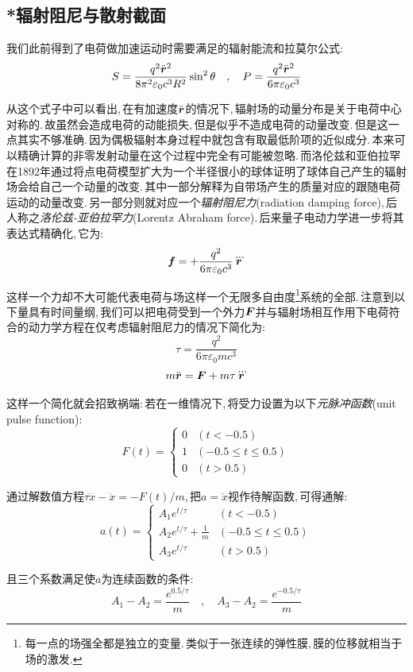 \subsection{*辐射阻尼与散射截面}

我们此前得到了电荷做加速运动时需要满足的辐射能流和拉莫尔公式:
\[S=\frac{q^2\ddot{\boldsymbol{r}}^2}{8\pi^2\varepsilon_0c^3 R^2}\sin^2\theta\quad ,\quad P=\frac{q^2\ddot{\boldsymbol{r}}^2}{6\pi\varepsilon_0c^3}\]

从这个式子中可以看出,\,在有加速度$\ddot{\boldsymbol{r}}$的情况下,\,辐射场的动量分布是关于电荷中心对称的.\,故虽然会造成电荷的动能损失,\,但是似乎不造成电荷的动量改变.\,但是这一点其实不够准确.\,因为偶极辐射本身过程中就包含有取最低阶项的近似成分.\,本来可以精确计算的非零发射动量在这个过程中完全有可能被忽略.\,而洛伦兹和亚伯拉罕在1892年通过将点电荷模型扩大为一个半径很小的球体证明了球体自己产生的辐射场会给自己一个动量的改变.\,其中一部分解释为自带场产生的质量对应的跟随电荷运动的动量改变.\,另一部分则就对应一个\emph{辐射阻尼力}(radiation damping force),\,后人称之\emph{洛伦兹-亚伯拉罕力}(Lorentz Abraham force).\,后来量子电动力学进一步将其表达式精确化,\,它为:
\[\boldsymbol{f}=+\frac{q^2}{6\pi\varepsilon_0c^3}\dddot{\boldsymbol{r}}\]

这样一个力却不大可能代表电荷与场这样一个无限多自由度\footnote{每一点的场强全都是独立的变量.\,类似于一张连续的弹性膜,\,膜的位移就相当于场的激发.}系统的全部.\,注意到以下量具有时间量纲,\,我们可以把电荷受到一个外力$\boldsymbol{F}$并与辐射场相互作用下电荷符合的动力学方程在仅考虑辐射阻尼力的情况下简化为:
\[\tau=\frac{q^2}{6\pi\varepsilon_0 mc^3}\]
\[m\ddot{\boldsymbol{r}}=\boldsymbol{F}+m\tau \dddot{\boldsymbol{r}}\]

这样一个简化就会招致祸端:\,若在一维情况下,\,将受力设置为以下\emph{元脉冲函数}(unit pulse function):
\[F(t)=\begin{cases}
0&(t<-0.5)\\
1&(-0.5\leq t\leq 0.5)\\
0&(t>0.5)
\end{cases}\]

通过解数值方程$\tau \dddot{x}-\ddot{x}=-F(t)/m$,\,把$a=\ddot{x}$视作待解函数,\,可得通解:
\[a(t)=\begin{cases}
A_1e^{t/\tau}&(t<-0.5)\\
A_2e^{t/\tau}+\frac{1}{m}&(-0.5\leq t\leq 0.5)\\
A_3e^{t/\tau}&(t>0.5)
\end{cases}\]

且三个系数满足使$a$为连续函数的条件:
\[A_1-A_2=\frac{e^{0.5/\tau}}{m}\quad ,\quad A_3-A_2=\frac{e^{-0.5/\tau}}{m}\]


